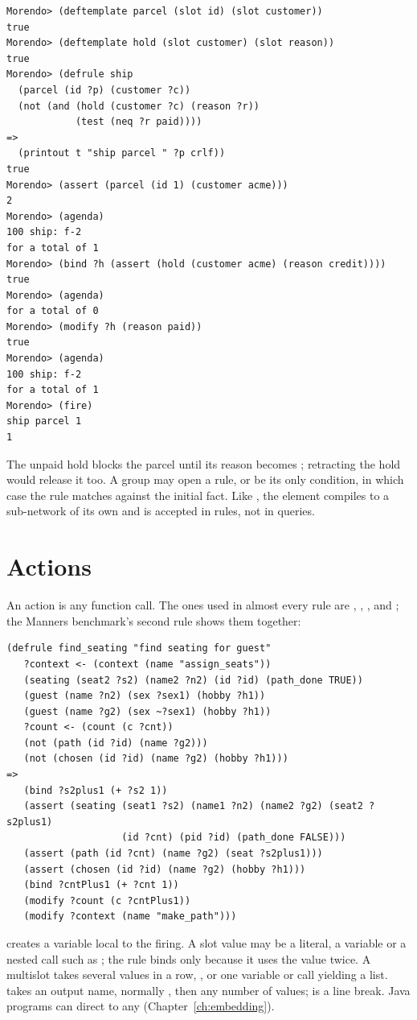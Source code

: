 \begin{lstlisting}[style=shell]
Morendo> (deftemplate parcel (slot id) (slot customer))
true
Morendo> (deftemplate hold (slot customer) (slot reason))
true
Morendo> (defrule ship
  (parcel (id ?p) (customer ?c))
  (not (and (hold (customer ?c) (reason ?r))
            (test (neq ?r paid))))
=>
  (printout t "ship parcel " ?p crlf))
true
Morendo> (assert (parcel (id 1) (customer acme)))
2
Morendo> (agenda)
100 ship: f-2
for a total of 1
Morendo> (bind ?h (assert (hold (customer acme) (reason credit))))
true
Morendo> (agenda)
for a total of 0
Morendo> (modify ?h (reason paid))
true
Morendo> (agenda)
100 ship: f-2
for a total of 1
Morendo> (fire)
ship parcel 1
1
\end{lstlisting}

The unpaid hold blocks the parcel until its reason becomes ;
retracting the hold would release it too. A group may open a rule, or be
its only condition, in which case the rule matches against the initial
fact. Like , the element compiles to a sub-network of its own
and is accepted in rules, not in queries.

\section{Actions}
\label{sec:actions}

An action is any function call. The ones used in almost every rule are
, , ,  and ;
the Manners benchmark's second rule shows them together:

\begin{lstlisting}
(defrule find_seating "find seating for guest"
   ?context <- (context (name "assign_seats"))
   (seating (seat2 ?s2) (name2 ?n2) (id ?id) (path_done TRUE))
   (guest (name ?n2) (sex ?sex1) (hobby ?h1))
   (guest (name ?g2) (sex ~?sex1) (hobby ?h1))
   ?count <- (count (c ?cnt))
   (not (path (id ?id) (name ?g2)))
   (not (chosen (id ?id) (name ?g2) (hobby ?h1)))
=>
   (bind ?s2plus1 (+ ?s2 1))
   (assert (seating (seat1 ?s2) (name1 ?n2) (name2 ?g2) (seat2 ?s2plus1)
                    (id ?cnt) (pid ?id) (path_done FALSE)))
   (assert (path (id ?cnt) (name ?g2) (seat ?s2plus1)))
   (assert (chosen (id ?id) (name ?g2) (hobby ?h1)))
   (bind ?cntPlus1 (+ ?cnt 1))
   (modify ?count (c ?cntPlus1))
   (modify ?context (name "make_path")))
\end{lstlisting}

 creates a variable local to the firing. A slot value may be a
literal, a variable or a nested call such as ; the
rule binds  only because it uses the value twice. A
multislot takes several values in a row, , or one
variable or call yielding a list.  takes an output name, normally
, then any number of values;  is a line break. Java programs can direct  to any
 (Chapter~\ref{ch:embedding}).

